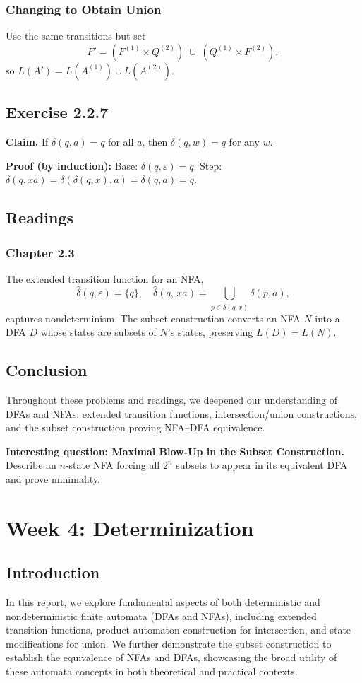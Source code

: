 \documentclass{article}
\theoremstyle{theorem}
\theoremstyle{definition}
\theoremstyle{remark}
\begin{document}
\subsubsection*{Changing to Obtain Union}
Use the same transitions but set
\[
  F' = (F^{(1)}\times Q^{(2)})\;\cup\;(Q^{(1)}\times F^{(2)}),
\]
so \(L(A')=L(A^{(1)})\cup L(A^{(2)})\).

\subsection*{Exercise 2.2.7}
\textbf{Claim.} If \(\delta(q,a)=q\) for all \(a\), then \(\delta(q,w)=q\) for any \(w\).

\textbf{Proof (by induction):}
Base: \(\delta(q,\varepsilon)=q\).  
Step: \(\delta(q,xa)=\delta(\delta(q,x),a)=\delta(q,a)=q\).

\subsection{Readings}

\subsubsection*{Chapter 2.3}
The extended transition function for an NFA,
\[
  \hat{\delta}(q,\varepsilon)=\{q\},\quad
  \hat{\delta}(q,\,xa)=\bigcup_{p\in\hat{\delta}(q,x)}\delta(p,a),
\]
captures nondeterminism.  The subset construction converts an NFA \(N\) into a DFA \(D\) whose states are subsets of \(N\)’s states, preserving \(L(D)=L(N)\).

\subsection{Conclusion}
Throughout these problems and readings, we deepened our understanding of DFAs and NFAs: extended transition functions, intersection/union constructions, and the subset construction proving NFA–DFA equivalence.

\textbf{Interesting question: Maximal Blow-Up in the Subset Construction.}\\
Describe an \(n\)-state NFA forcing all \(2^n\) subsets to appear in its equivalent DFA and prove minimality.

\section{Week 4: Determinization}

\subsection{Introduction}
In this report, we explore fundamental aspects of both deterministic and nondeterministic finite automata (DFAs and NFAs), including extended transition functions, product automaton construction for intersection, and state modifications for union. We further demonstrate the subset construction to establish the equivalence of NFAs and DFAs, showcasing the broad utility of these automata concepts in both theoretical and practical contexts.
\end{document}
